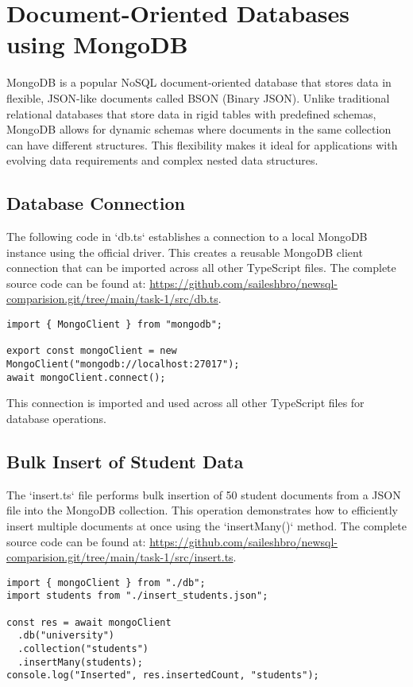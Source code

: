 \chapter{Document-Oriented Databases using MongoDB}

MongoDB is a popular NoSQL document-oriented database that stores data in flexible, JSON-like documents called BSON (Binary JSON). Unlike traditional relational databases that store data in rigid tables with predefined schemas, MongoDB allows for dynamic schemas where documents in the same collection can have different structures. This flexibility makes it ideal for applications with evolving data requirements and complex nested data structures.

\section{Database Connection}
The following code in `db.ts` establishes a connection to a local MongoDB instance using the official driver. This creates a reusable MongoDB client connection that can be imported across all other TypeScript files. The complete source code can be found at: \url{https://github.com/saileshbro/newsql-comparision.git/tree/main/task-1/src/db.ts}.

\begin{verbatim}
import { MongoClient } from "mongodb";

export const mongoClient = new MongoClient("mongodb://localhost:27017");
await mongoClient.connect();
\end{verbatim}

This connection is imported and used across all other TypeScript files for database operations.

\section{Bulk Insert of Student Data}
The `insert.ts` file performs bulk insertion of 50 student documents from a JSON file into the MongoDB collection. This operation demonstrates how to efficiently insert multiple documents at once using the `insertMany()` method. The complete source code can be found at: \url{https://github.com/saileshbro/newsql-comparision.git/tree/main/task-1/src/insert.ts}.

\begin{verbatim}
import { mongoClient } from "./db";
import students from "./insert_students.json";

const res = await mongoClient
  .db("university")
  .collection("students")
  .insertMany(students);
console.log("Inserted", res.insertedCount, "students");
\end{verbatim}

